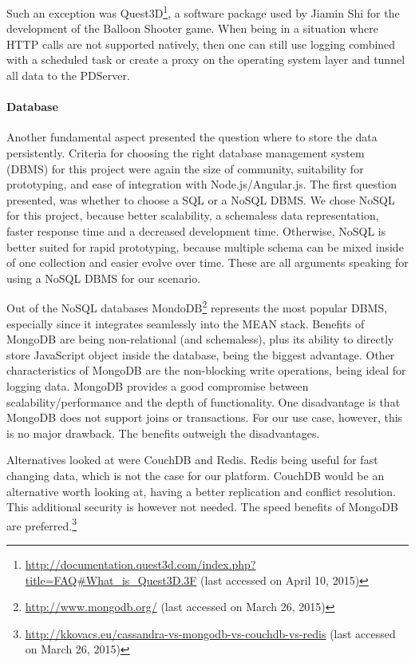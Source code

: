 		Such an exception was Quest3D\footnote{\url{http://documentation.quest3d.com/index.php?title=FAQ\#What_is_Quest3D.3F} (last accessed on April 10, 2015)}, a software package used by Jiamin Shi for the development of the Balloon Shooter game. When being in a situation where HTTP calls are not supported natively, then one can still use logging combined with a scheduled task or create a proxy on the operating system layer and tunnel all data to the PDServer.





	\paragraph{Database}

		Another fundamental aspect presented the question where to store the data persistently. Criteria for choosing the right database management system (DBMS) for this project were again the size of community, suitability for prototyping, and ease of integration with Node.js/Angular.js. The first question presented, was whether to choose a SQL or a NoSQL DBMS. We chose NoSQL for this project, because better scalability, a schemaless data representation, faster response time and a decreased development time\cite{vaish2013getting}. Otherwise, NoSQL is better suited for rapid prototyping, because multiple schema can be mixed inside of one collection and easier evolve over time. These are all arguments speaking for using a NoSQL DBMS for our scenario. 

		Out of the NoSQL databases MondoDB\footnote{\url{http://www.mongodb.org/} (last accessed on March 26, 2015)} represents the most popular DBMS, especially since it integrates seamlessly into the MEAN stack. Benefits of MongoDB are being non-relational (and schemaless), plus its ability to directly store JavaScript object inside the database, being the biggest advantage. Other characteristics of MongoDB are the non-blocking write operations, being ideal for logging data. MongoDB provides a good compromise between scalability/performance and the depth of functionality. One disadvantage is that MongoDB does not support joins or transactions. For our use case, however, this is no major drawback. The benefits outweigh the disadvantages. 

		Alternatives looked at were CouchDB and Redis. Redis being useful for fast changing data, which is not the case for our platform. CouchDB would be an alternative worth looking at, having a better replication and conflict resolution. This additional security is however not needed. The speed benefits of MongoDB are preferred.\footnote{\url{http://kkovacs.eu/cassandra-vs-mongodb-vs-couchdb-vs-redis} (last accessed on March 26, 2015)}

